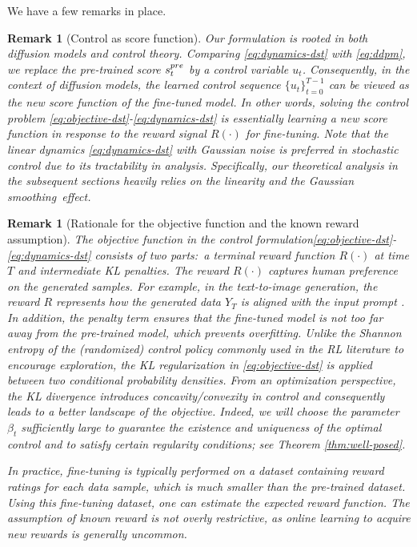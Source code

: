 \documentclass[10pt,a4paper]{amsart}
\newtheorem{Remark}[Theorem]{Remark}
\begin{document}
{We have a few remarks in place.}    
\begin{Remark}[Control as score function]
    Our formulation is rooted in both diffusion models and control theory. Comparing \eqref{eq:dynamics-dst} with \eqref{eq:ddpm}, we replace the pre-trained score $s_t^{\rm pre}$ by a control variable $u_t$. Consequently, in the context of diffusion models, the learned control sequence $\{u_t\}_{t=0}^{T-1}$ can be viewed as the {\it new} score function of the fine-tuned model. In other words, solving the control problem \eqref{eq:objective-dst}-\eqref{eq:dynamics-dst} is essentially learning a new score function in response to the reward signal $R(\cdot)$ for fine-tuning. Note that the linear dynamics \eqref{eq:dynamics-dst} with Gaussian noise is preferred in stochastic control due to its tractability in analysis. Specifically, our theoretical analysis in the subsequent sections heavily relies on the linearity and the Gaussian smoothing~effect.
\end{Remark} 

\begin{Remark}[Rationale for the objective function and the known reward assumption]
     The objective function in the control formulation\eqref{eq:objective-dst}-\eqref{eq:dynamics-dst}  consists of two parts:~a terminal reward function $R(\cdot)$ at time $T$ and intermediate KL penalties. The reward $R(\cdot)$ captures human preference on the generated samples. For example, in the text-to-image generation, the reward $R$ represents how the generated data $Y_T$ is aligned with the input prompt \cite{fan2024reinforcement,black2023training}. In addition, the penalty term ensures that the fine-tuned model is not too far away from the pre-trained model, which prevents overfitting. Unlike the Shannon entropy of the (randomized) control policy commonly used in the RL literature to encourage exploration, the KL regularization in \eqref{eq:objective-dst}  is applied between two conditional probability densities. From an optimization perspective, the KL divergence introduces   concavity/convexity in control and consequently leads to a better landscape of the objective. Indeed, we will choose the parameter $\beta_t$ sufficiently large to guarantee the existence and uniqueness of the optimal control and to satisfy certain regularity conditions; see Theorem \ref{thm:well-posed}.

    In practice, fine-tuning is typically performed on a dataset containing reward ratings for each data sample, which is much smaller than the pre-trained dataset. Using this fine-tuning dataset, one can estimate the expected reward function. The assumption of known reward is not overly restrictive, as online learning to acquire new rewards is generally uncommon.
\end{Remark}    
    
\end{document}

